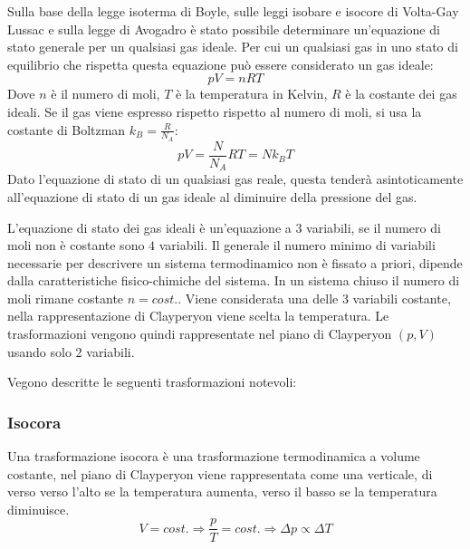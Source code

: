 \documentclass{article}
\numberwithin{equation}{subsection}
\begin{document}
Sulla base della legge isoterma di Boyle, sulle leggi isobare e isocore di Volta-Gay Lussac e sulla legge di Avogadro è stato possibile determinare un'equazione di stato 
generale per un qualsiasi gas ideale. Per cui un qualsiasi gas in uno stato di equilibrio che rispetta questa equazione può essere considerato un gas ideale: 
\begin{equation}
    pV=nRT
\end{equation}
Dove $n$ è il numero di moli, $T$ è la temperatura in Kelvin, 
$R$ è la costante dei gas ideali. Se il gas viene espresso 
rispetto rispetto al numero di moli, si usa la costante di 
Boltzman $k_B=\displaystyle\frac{R}{N_A}$:
\begin{equation*}
    pV=\displaystyle\frac{N}{N_A}RT=Nk_BT
\end{equation*} 
Dato l'equazione di stato di un qualsiasi gas reale, questa tenderà asintoticamente all'equazione di stato di un gas ideale al diminuire della pressione del gas. 



L'equazione di stato dei gas ideali è un'equazione a $3$ 
variabili, se il numero di moli non è costante sono $4$ 
variabili. Il generale il numero minimo di variabili necessarie per descrivere un sistema termodinamico non è fissato a priori, dipende dalla caratteristiche 
fisico-chimiche del sistema. In un sistema chiuso il numero di moli 
rimane costante $n=cost.$. Viene considerata una delle $3$ variabili 
costante, nella rappresentazione di Clayperyon viene scelta 
la temperatura. Le trasformazioni vengono quindi rappresentate 
nel piano di Clayperyon $(p,V)$ usando solo $2$ variabili. 



Vegono descritte le seguenti trasformazioni notevoli:
\subsubsection{Isocora}
Una trasformazione isocora è una trasformazione termodinamica 
a volume costante, nel piano di Clayperyon viene rappresentata 
come una verticale, di verso verso l'alto se la temperatura 
aumenta, verso il basso se la temperatura diminuisce. 
\begin{equation*}
    V=cost.\Rightarrow
    \displaystyle\frac{p}{T}=cost.\Rightarrow
    \Delta p \propto\Delta T
\end{equation*}

\begin{center}\end{center}
\end{document}
